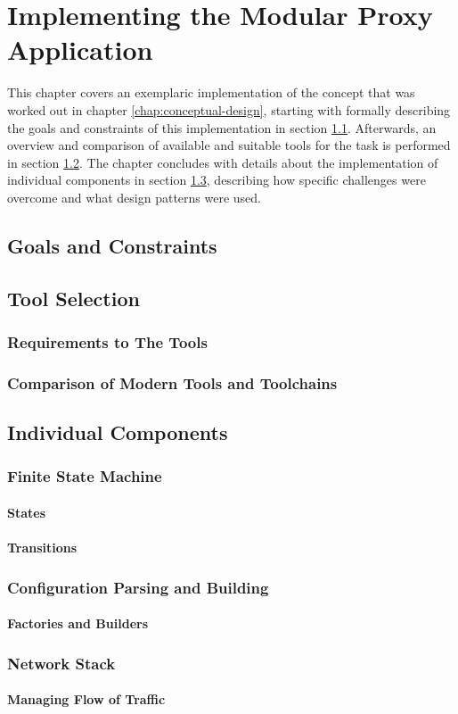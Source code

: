 \chapter{Implementing the Modular Proxy Application}
\label{chap:implementation}
This chapter covers an exemplaric implementation of the concept that was worked out in chapter \ref{chap:conceptual-design}, starting with formally describing the goals and constraints of this implementation in section \ref{sec:goals-constraints}. Afterwards, an overview and comparison of available and suitable tools for the task is performed in section \ref{sec:tool-selection}. The chapter concludes with details about the implementation of individual components in section \ref{sec:individual-components}, describing how specific challenges were overcome and what design patterns were used.

\section{Goals and Constraints}
\label{sec:goals-constraints}

\section{Tool Selection}
\label{sec:tool-selection}

\subsection{Requirements to The Tools}
\subsection{Comparison of Modern Tools and Toolchains}

\section{Individual Components}
\label{sec:individual-components}

\subsection{Finite State Machine}
\subsubsection{States}
\subsubsection{Transitions}
\subsection{Configuration Parsing and Building}
\subsubsection{Factories and Builders}
\subsection{Network Stack}
\subsubsection{Managing Flow of Traffic}